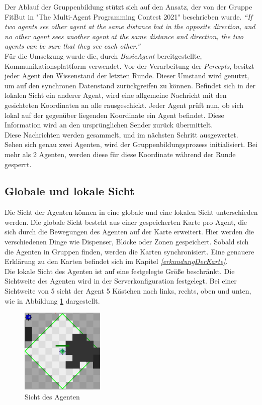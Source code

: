 Der Ablauf der Gruppenbildung stützt sich auf den Ansatz, der von der Gruppe FitBut in "The Multi-Agent Programming Contest 2021" beschrieben wurde. \textit{ “If two agents see other agent at the same distance but in the opposite direction, and no other agent sees another agent at the same distance and direction, the two agents can be sure that they see each other.” } \cite{ref_book1}  \\

Für die Umsetzung wurde die, durch \textit{BasicAgent}  bereitgestellte, Kommunikationsplattform verwendet. Vor der Verarbeitung der \textit{Percepts}, besitzt jeder Agent den Wissenstand der letzten Runde. Dieser Umstand wird genutzt, um auf den synchronen Datenstand zurückgreifen zu können. Befindet sich in der lokalen Sicht ein anderer Agent, wird eine allgemeine Nachricht mit den gesichteten Koordinaten an alle rausgeschickt. Jeder Agent prüft nun, ob sich lokal auf der gegenüber liegenden Koordinate ein Agent befindet. Diese Information wird an den ursprünglichen Sender zurück übermittelt.  \\

Diese Nachrichten werden gesammelt, und im nächsten Schritt ausgewertet. Sehen sich genau zwei Agenten, wird der Gruppenbildungsprozess initialisiert. Bei mehr als 2 Agenten, werden diese für diese Koordinate während der Runde gesperrt. \\


\subsection{Globale und lokale Sicht}
Die Sicht der Agenten können in eine globale und eine lokalen Sicht unterschieden werden. Die globale Sicht besteht aus einer gespeicherten Karte pro Agent, die sich durch die Bewegungen des Agenten auf der Karte erweitert. Hier werden die verschiedenen Dinge wie Dispenser, Blöcke oder Zonen gespeichert. Sobald sich die Agenten in Gruppen finden, werden die Karten synchronisiert. Eine genauere Erklärung zu den Karten befindet sich im Kapitel \textit{\ref{erkundungDerKarte}}.\\

Die lokale Sicht des Agenten ist auf eine festgelegte Größe beschränkt. Die Sichtweite des Agenten wird in der Serverkonfiguration festgelegt. Bei einer Sichtweite von 5 sieht der Agent 5 Kästchen nach links, rechts, oben und unten, wie in Abbildung \ref{fig:agentensicht} dargestellt.
\begin{figure}
	\centering
	\includegraphics[width=150px]{bilder/agentensicht}
	\caption{Sicht des Agenten}
	\label{fig:agentensicht}
\end{figure}

